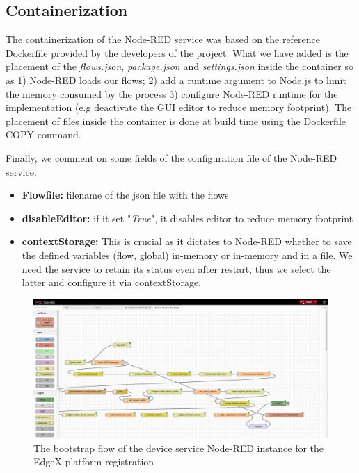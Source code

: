 \subsection{Containerization}
The containerization of the Node-RED service was based on the reference Dockerfile provided by the developers of the project\cite{nodered-docker}. What we have added is the placement of the \textit{flows.json}, \textit{package.json }and \textit{settings.json} inside the container so as 1) Node-RED loads our flows; 2) add a runtime argument to Node.js to limit the memory consumed by the process 3) configure Node-RED runtime for the implementation (e.g deactivate the GUI editor to reduce memory footprint). The placement of files inside the container is done at build time using the Dockerfile \texttt{}{COPY} command.

\bigskip \noindent
Finally, we comment on some fields of the configuration file of the Node-RED service:
\begin{itemize}
    \item \textbf{Flowfile:} filename of the json file with the flows
    \item \textbf{disableEditor:} if it set "\textit{True}", it disables editor to reduce memory footprint
    \item \textbf{contextStorage:} This is crucial as it dictates to Node-RED whether to save the defined variables (flow, global) in-memory or in-memory and in a file. We need the service to retain its status even after restart, thus we select the latter and configure it via contextStorage.
\end{itemize}

\newpage
\begin{figure}
    \centering
    \includegraphics[width=\textwidth]{images/nodered_devserv_boot1.png}
    \caption{The bootstrap flow of the device service Node-RED instance for the EdgeX platform registration}
    \label{fig:devserv-boot1}
\end{figure}

